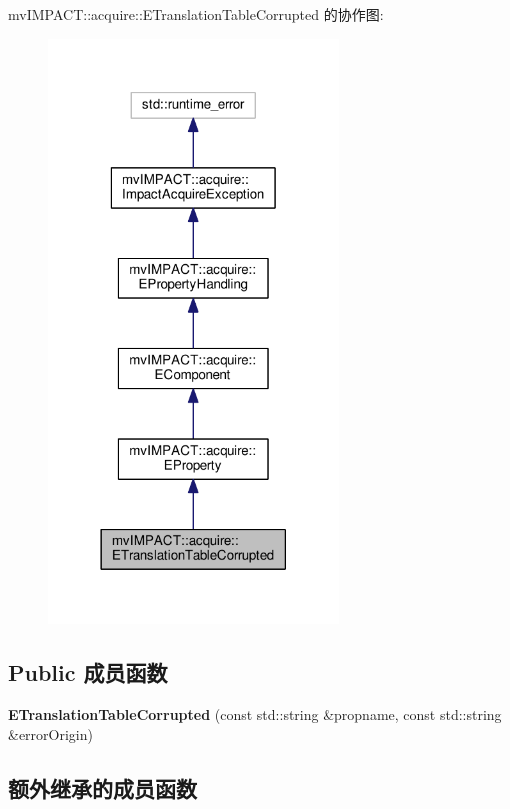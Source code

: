 mv\+I\+M\+P\+A\+C\+T\+:\+:acquire\+:\+:E\+Translation\+Table\+Corrupted 的协作图\+:
\nopagebreak
\begin{figure}[H]
\begin{center}
\leavevmode
\includegraphics[width=218pt]{classmv_i_m_p_a_c_t_1_1acquire_1_1_e_translation_table_corrupted__coll__graph}
\end{center}
\end{figure}
\subsection*{Public 成员函数}
\begin{DoxyCompactItemize}
\item 
\hypertarget{classmv_i_m_p_a_c_t_1_1acquire_1_1_e_translation_table_corrupted_a31537d1a84c5453c9db42121928656f1}{{\bfseries E\+Translation\+Table\+Corrupted} (const std\+::string \&propname, const std\+::string \&error\+Origin)}\label{classmv_i_m_p_a_c_t_1_1acquire_1_1_e_translation_table_corrupted_a31537d1a84c5453c9db42121928656f1}

\end{DoxyCompactItemize}
\subsection*{额外继承的成员函数}


